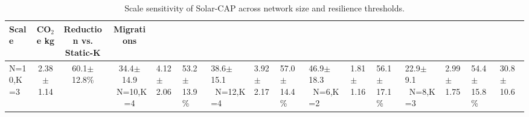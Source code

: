 \begin{table}[t]
\centering
\caption{Scale sensitivity of Solar-CAP across network size and resilience thresholds.}
\label{tab:scale_sensitivity}
\begin{tabular}{lccc}
\toprule
\textbf{Scale} & \textbf{CO$_2$e kg} & \textbf{Reduction vs. Static-K} & \textbf{Migrations} \\
\midrule
N=10,K=3 & 2.38$\pm$1.14 & 60.1$\pm$12.8\% & 34.4$\pm$14.9 \
N=10,K=4 & 4.12$\pm$2.06 & 53.2$\pm$13.9\% & 38.6$\pm$15.1 \
N=12,K=4 & 3.92$\pm$2.17 & 57.0$\pm$14.4\% & 46.9$\pm$18.3 \
N=6,K=2 & 1.81$\pm$1.16 & 56.1$\pm$17.1\% & 22.9$\pm$9.1 \
N=8,K=3 & 2.99$\pm$1.75 & 54.4$\pm$15.8\% & 30.8$\pm$10.6 \
\bottomrule
\end{tabular}
\end{table}